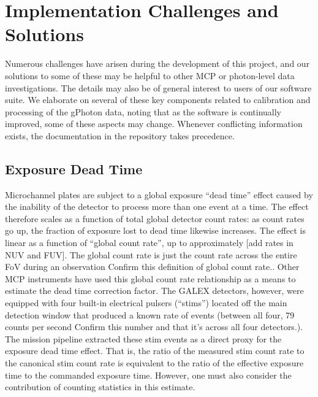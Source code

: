 \documentclass[5p]{elsarticle}
\begin{document}
\section{Implementation Challenges and Solutions}
\label{implementation}
Numerous challenges have arisen during the development of this project, and our solutions to some of these may be helpful to other MCP or photon-level data investigations. The details may also be of general interest to users of our software suite.  We elaborate on several of these key components related to calibration and processing of the gPhoton data, noting that as the software is continually improved, some of these aspects may change.  Whenever conflicting information exists, the documentation in the repository takes precedence.

\subsection{Exposure Dead Time}
\label{deadtimedesc}
Microchannel plates are subject to a global exposure ``dead time'' effect caused by the inability of the detector to process more than one event at a time. The effect therefore scales as a function of total global detector count rates: as count rates go up, the fraction of exposure lost to dead time likewise increases. The effect is linear as a function of ``global count rate'', up to approximately {\color{red}[add rates in NUV and FUV]}.  The global count rate is just the count rate across the entire FoV during an observation {\color{red} Confirm this definition of global count rate.}. Other MCP instruments have used this global count rate relationship as a means to estimate the dead time correction factor. The GALEX detectors, however, were equipped with four built-in electrical pulsers (``stims'') located off the main detection window that produced a known rate of events (between all four, 79 counts per second {\color{red}Confirm this number and that it's across all four detectors.}). The mission pipeline extracted these stim events as a direct proxy for the exposure dead time effect. That is, the ratio of the measured stim count rate to the canonical stim count rate is equivalent to the ratio of the effective exposure time to the commanded exposure time. However, one must also consider the contribution of counting statistics in this estimate.
\end{document}
